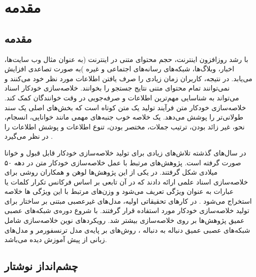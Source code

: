 \chapter{مقدمه}
\section{مقدمه}
با رشد روزافزون اینترنت، حجم محتوای متنی در اینترنت (به عنوان مثال وب سایت‌ها، اخبار، وبلاگ‌ها، شبکه‌های رسانه‌های اجتماعی و غیره )به صورت تصاعدی افزایش می‌یابد. در نتیجه، کاربران زمان زیادی را صرف یافتن اطلاعات مورد نظر خود می‌کنند و نمی‌توانند تمام محتوای متنی نتایج جستجو را بخوانند. خلاصه‌سازی خودکار اسناد می‌تواند به شناسایی مهم‌ترین اطلاعات و صرفه‌جویی در وقت خوانندگان کمک کند. خلاصه‌سازی خودکار متن فرآیند تولید یک متن کوتاه است که بخش‌های اصلی یک سند طولانی‌تر را پوشش می‌دهد. یک خلاصه خوب جنبه‌های مهمی مانند خوانایی، انسجام، نحو، غیر زائد بودن، ترتیب جملات، مختصر بودن، تنوع اطلاعات و پوشش اطلاعات را در نظر می‌گیرد
\cite{ELKASSAS2021113679}.


در سال‌های گذشته تلاش‌های زیادی برای تولید خلاصه‌سازی خودکار قابل قبول و خوانا صورت گرفته است. 
پژوهش‌های مرتبط با عمل خلاصه‌سازی خودکار متن در دهه ۵۰ میلادی شکل گرفتند. در یکی از این پژوهش‌ها لوهن و همکاران روشی برای خلاصه‌سازی اسناد علمی ‌ارائه دادند که در آن تابعی بر اساس فرکانس تکرار کلمات یا عبارات به عنوان ویژگی تعریف ‌می‌شود و وزن‌های مرتبط با این ویژگی ها خلاصه استخراج می‌شود
\cite{luhn1958automatic}.
در کارهای تحقیقاتی اولیه، مدل‌های غیرعصبی  مبتنی بر ساختار برای تولید خلاصه‌سازی خودکار مورد استفاده قرار گرفتند. با شروع دوره‌ی شبکه‌های عصبی عمیق پژوهش‌ها بر روی خلاصه‌سازی بیشتر شد. رویکرد‌های نوین خلاصه‌سازی شامل شبکه‌های عصبی عمیق دنباله به دنباله
، روش‌های بر پایه‌ی مدل ترنسفورمر 
و مدل‌های زبانی از پیش آموزش دیده
می‌باشد. 
\section{چشم‌انداز نوشتار}


